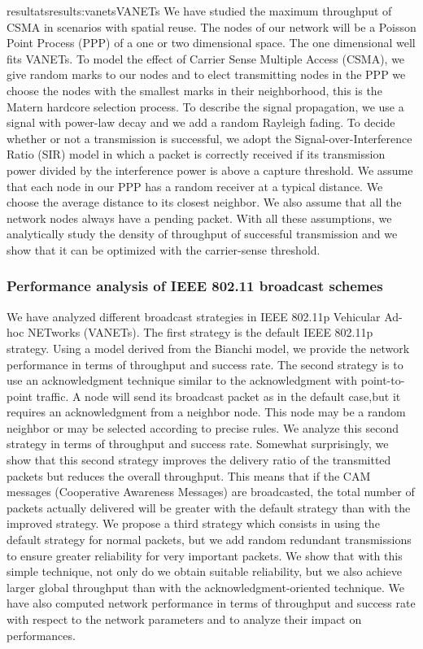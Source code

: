 \documentclass{ra2016}
\begin{document}
\begin{module}{resultats}{results:vanets}{VANETs}
We have studied  the maximum throughput of CSMA in scenarios with spatial reuse.
The nodes of our network will be a Poisson Point Process (PPP) of a one or two dimensional space.
The one dimensional well fits VANETs.
To model the effect of Carrier Sense Multiple Access (CSMA), we give random marks to our nodes and to elect transmitting nodes in the PPP we choose the nodes with the smallest marks in their neighborhood, this is the Matern hardcore selection process.
To describe the signal propagation, we use a signal with power-law decay and we add a random Rayleigh fading.
To decide whether or not a transmission is successful, we adopt the Signal-over-Interference Ratio (SIR) model in which a packet is correctly received if its transmission power divided by the interference power is above a capture threshold.
We assume that each node in our PPP has a random receiver at a typical distance.
We choose the average distance to its closest neighbor.
We also assume that all the network nodes always have a pending packet.
With all these assumptions, we analytically study the density of throughput of successful transmission and we show that it can be optimized with the carrier-sense threshold. 

\subsubsection{Performance analysis of IEEE 802.11 broadcast schemes}

We have analyzed different broadcast
strategies in IEEE 802.11p Vehicular Ad-hoc NETworks
(VANETs). The first strategy is the default IEEE 802.11p strategy.
Using a model derived from the Bianchi model, we provide
the network performance in terms of throughput and success
rate. The second strategy is to use an acknowledgment technique
similar to the acknowledgment with point-to-point traffic. A node
will send its broadcast packet as in the default case,but it requires
an acknowledgment from a neighbor node. This node may be a
random neighbor or may be selected according to precise rules.
We analyze this second strategy in terms of throughput and
success rate. Somewhat surprisingly, we show that this second
strategy improves the delivery ratio of the transmitted packets
but reduces the overall throughput. This means that if the CAM
messages (Cooperative Awareness Messages) are broadcasted, the
total number of packets actually delivered will be greater with
the default strategy than with the improved strategy. We propose
a third strategy which consists in using the default strategy for
normal packets, but we add random redundant transmissions to
ensure greater reliability for very important packets. We show
that with this simple technique, not only do we obtain suitable
reliability, but we also achieve larger global throughput than with
the acknowledgment-oriented technique.
We have also computed network performance
in terms of throughput and success rate with respect to the
network parameters and to analyze their impact on performances.

\end{module} 
\end{document}
